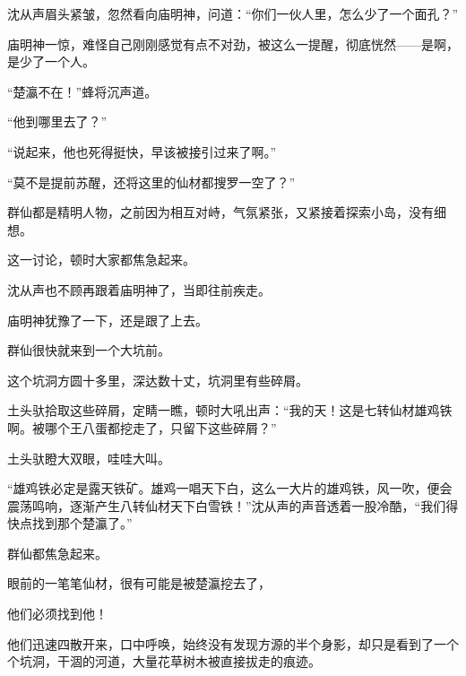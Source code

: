\begin{this_body}
沈从声眉头紧皱，忽然看向庙明神，问道：“你们一伙人里，怎么少了一个面孔？”

庙明神一惊，难怪自己刚刚感觉有点不对劲，被这么一提醒，彻底恍然——是啊，是少了一个人。

“楚瀛不在！”蜂将沉声道。

“他到哪里去了？”

“说起来，他也死得挺快，早该被接引过来了啊。”

“莫不是提前苏醒，还将这里的仙材都搜罗一空了？”

群仙都是精明人物，之前因为相互对峙，气氛紧张，又紧接着探索小岛，没有细想。

这一讨论，顿时大家都焦急起来。

沈从声也不顾再跟着庙明神了，当即往前疾走。

庙明神犹豫了一下，还是跟了上去。

群仙很快就来到一个大坑前。

这个坑洞方圆十多里，深达数十丈，坑洞里有些碎屑。

土头驮拾取这些碎屑，定睛一瞧，顿时大吼出声：“我的天！这是七转仙材雄鸡铁啊。被哪个王八蛋都挖走了，只留下这些碎屑？”

土头驮瞪大双眼，哇哇大叫。

“雄鸡铁必定是露天铁矿。雄鸡一唱天下白，这么一大片的雄鸡铁，风一吹，便会震荡鸣响，逐渐产生八转仙材天下白雪铁！”沈从声的声音透着一股冷酷，“我们得快点找到那个楚瀛了。”

群仙都焦急起来。

眼前的一笔笔仙材，很有可能是被楚瀛挖去了，

他们必须找到他！

他们迅速四散开来，口中呼唤，始终没有发现方源的半个身影，却只是看到了一个个坑洞，干涸的河道，大量花草树木被直接拔走的痕迹。

\end{this_body}

